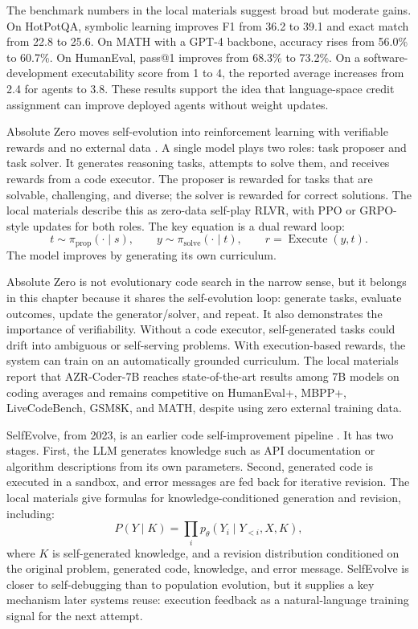 The benchmark numbers in the local materials suggest broad but moderate gains.  On HotPotQA, symbolic learning improves F1 from 36.2 to 39.1 and exact match from 22.8 to 25.6.  On MATH with a GPT-4 backbone, accuracy rises from 56.0\% to 60.7\%.  On HumanEval, pass@1 improves from 68.3\% to 73.2\%.  On a software-development executability score from 1 to 4, the reported average increases from 2.4 for agents to 3.8.  These results support the idea that language-space credit assignment can improve deployed agents without weight updates.

Absolute Zero moves self-evolution into reinforcement learning with verifiable rewards and no external data \cite{absolutezero2025}.  A single model plays two roles: task proposer and task solver.  It generates reasoning tasks, attempts to solve them, and receives rewards from a code executor.  The proposer is rewarded for tasks that are solvable, challenging, and diverse; the solver is rewarded for correct solutions.  The local materials describe this as zero-data self-play RLVR, with PPO or GRPO-style updates for both roles.  The key equation is a dual reward loop:
\begin{equation}
  t \sim \pi_{\mathrm{prop}}(\cdot\mid s),\qquad y\sim\pi_{\mathrm{solve}}(\cdot\mid t),\qquad r=\operatorname{Execute}(y,t).
\end{equation}
The model improves by generating its own curriculum.

Absolute Zero is not evolutionary code search in the narrow sense, but it belongs in this chapter because it shares the self-evolution loop: generate tasks, evaluate outcomes, update the generator/solver, and repeat.  It also demonstrates the importance of verifiability.  Without a code executor, self-generated tasks could drift into ambiguous or self-serving problems.  With execution-based rewards, the system can train on an automatically grounded curriculum.  The local materials report that AZR-Coder-7B reaches state-of-the-art results among 7B models on coding averages and remains competitive on HumanEval+, MBPP+, LiveCodeBench, GSM8K, and MATH, despite using zero external training data.

SelfEvolve, from 2023, is an earlier code self-improvement pipeline \cite{selfevolve2023}.  It has two stages.  First, the LLM generates knowledge such as API documentation or algorithm descriptions from its own parameters.  Second, generated code is executed in a sandbox, and error messages are fed back for iterative revision.  The local materials give formulas for knowledge-conditioned generation and revision, including:
\begin{equation}
  P(Y\mid K)=\prod_i p_\theta(Y_i\mid Y_{<i},X,K),
\end{equation}
where $K$ is self-generated knowledge, and a revision distribution conditioned on the original problem, generated code, knowledge, and error message.  SelfEvolve is closer to self-debugging than to population evolution, but it supplies a key mechanism later systems reuse: execution feedback as a natural-language training signal for the next attempt.

